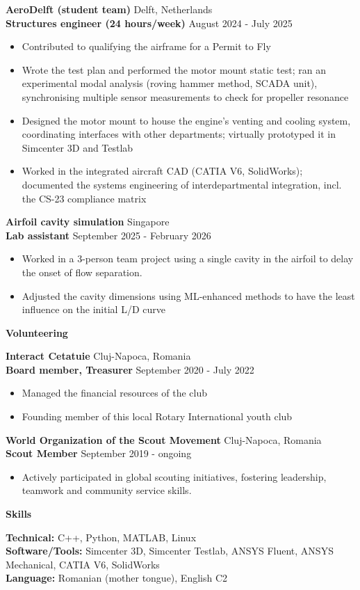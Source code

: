 \documentclass[11pt]{article}
\newcommand{\cvsection}[1]{%
  \vspace{10pt}%
  \centerline{\textbf{#1}}%
  \vspace{8pt}%
}
\newcommand{\cvrole}[4]{%
  \textbf{#1} \hfill #2 \\
  \textbf{#3} \hfill #4\par
}
\newcommand{\cvgap}{\vspace{0.7em}}
\begin{document}
\cvrole{AeroDelft (student team)}{Delft, Netherlands}{Structures engineer (24 hours/week)}{August 2024 - July 2025}
\begin{itemize}
  \item Contributed to qualifying the airframe for a Permit to Fly
  \item Wrote the test plan and performed the motor mount static test; ran an experimental modal analysis (roving hammer method, SCADA unit), synchronising multiple sensor measurements to check for propeller resonance
  \item Designed the motor mount to house the engine's venting and cooling system, coordinating interfaces with other departments; virtually prototyped it in Simcenter 3D and Testlab
  \item Worked in the integrated aircraft CAD (CATIA V6, SolidWorks); documented the systems engineering of interdepartmental integration, incl. the CS-23 compliance matrix
\end{itemize}
\cvgap

\cvrole{Airfoil cavity simulation}{Singapore}{Lab assistant}{September 2025 - February 2026}
\begin{itemize}
  \item Worked in a 3-person team project using a single cavity in the airfoil to delay the onset of flow separation.
  \item Adjusted the cavity dimensions using ML-enhanced methods to have the least influence on the initial L/D curve
\end{itemize}

\cvsection{Volunteering}

\cvrole{Interact Cetatuie}{Cluj-Napoca, Romania}{Board member, Treasurer}{September 2020 - July 2022}
\begin{itemize}
  \item Managed the financial resources of the club
  \item Founding member of this local Rotary International youth club
\end{itemize}
\cvgap

\cvrole{World Organization of the Scout Movement}{Cluj-Napoca, Romania}{Scout Member}{September 2019 - ongoing}
\begin{itemize}
  \item Actively participated in global scouting initiatives, fostering leadership, teamwork and community service skills.
\end{itemize}

\vspace{-8pt}
\cvsection{Skills}

\textbf{Technical:} C++, Python, MATLAB, Linux \\
\textbf{Software/Tools:} Simcenter 3D, Simcenter Testlab, ANSYS Fluent, ANSYS Mechanical, CATIA V6, SolidWorks \\
\textbf{Language:} Romanian (mother tongue), English C2
\end{document}
